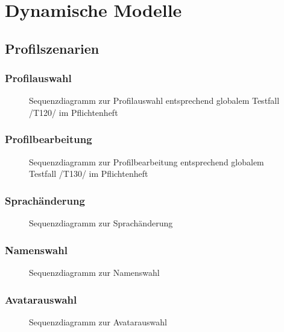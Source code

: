 \section{Dynamische Modelle}

\subsection{Profilszenarien}

\subsubsection{Profilauswahl}
\begin{figure}[H]
\centering
{}
\caption{Sequenzdiagramm zur Profilauswahl entsprechend globalem Testfall /T120/ im Pflichtenheft}
\end{figure}

\subsubsection{Profilbearbeitung}
\begin{figure}[H]
\centering
{}
\caption{Sequenzdiagramm zur Profilbearbeitung entsprechend globalem Testfall /T130/ im Pflichtenheft}
\end{figure}

\subsubsection{Sprachänderung}
\begin{figure}[H]
\centering
{}
\caption{Sequenzdiagramm zur Sprachänderung}
\end{figure}

\subsubsection{Namenswahl}
\begin{figure}[H]
\centering
{}
\caption{Sequenzdiagramm zur Namenswahl}
\end{figure}

\subsubsection{Avatarauswahl}
\begin{figure}[H]
\centering
{}

\caption{Sequenzdiagramm zur Avatarauswahl}
\end{figure}